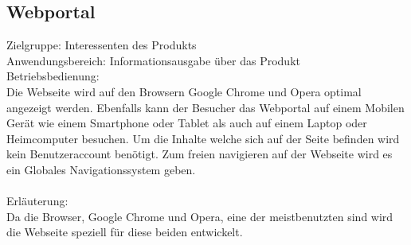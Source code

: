 \subsection{Webportal}
Zielgruppe: Interessenten des Produkts
\\
Anwendungsbereich: Informationsausgabe über das Produkt
\\
Betriebsbedienung:
\\
Die Webseite wird auf den Browsern Google Chrome und Opera optimal angezeigt werden. Ebenfalls kann der Besucher das Webportal auf einem Mobilen Gerät wie einem Smartphone oder Tablet als auch auf einem Laptop oder Heimcomputer besuchen. Um die Inhalte welche sich auf der Seite befinden wird kein Benutzeraccount benötigt. Zum freien navigieren auf der Webseite wird es ein Globales Navigationssystem geben.
\\\\
Erläuterung:
\\
Da die Browser, Google Chrome und Opera, eine der meistbenutzten sind wird die Webseite speziell für diese beiden entwickelt. 
